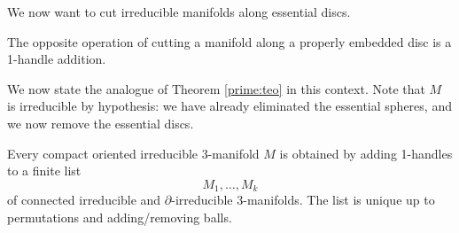 We now want to cut irreducible manifolds along essential discs.

\begin{rem}
The opposite operation of cutting a manifold along a properly embedded disc is a 1-handle addition.
\end{rem}

We now state the analogue of Theorem \ref{prime:teo} in this context. Note that $M$ is irreducible by hypothesis: we have already eliminated the essential spheres, and we now remove the essential discs. 

\begin{teo}
Every compact oriented irreducible 3-manifold $M$ is obtained by adding 1-handles to a finite list
$$M_1,\ldots, M_k$$
of connected irreducible and $\partial$-irreducible 3-manifolds. The list is unique
up to permutations and adding/removing balls.
\end{teo}
